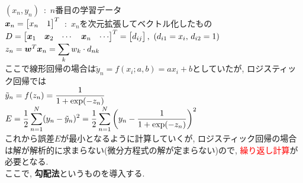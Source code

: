 \documentclass[dvipdfmx,a4j]{jsarticle}
\begin{document}
$(x_{n},y_{n})$\ :\ $n$番目の学習データ\\
$\mbox{\boldmath $x$}_{n}=\begin{bmatrix} x_{n}&1 \end{bmatrix}^{T}$\ :\ $x_{n}$を次元拡張してベクトル化したもの\\
$D=\begin{bmatrix}\mbox{\boldmath $x$}_{1}&\mbox{\boldmath $x$}_{2}&\cdots &\mbox{\boldmath $x$}_{n}&\cdots \end{bmatrix}^{T}=\begin{bmatrix}d_{ij}\end{bmatrix},\ (d_{i1}=x_{i},\,d_{i2}=1)$\\
$z_{n}=\mbox{\boldmath $w$}^{T}\mbox{\boldmath $x$}_{n}=\displaystyle \sum_{k}w_{k}\cdot d_{nk}$\\
ここで線形回帰の場合は$\tilde{y}_{n}=f(x_{i};a,b)=ax_{i}+b$としていたが, ロジスティック回帰では\\
$\tilde{y}_{n}=f(z_{n})=\displaystyle \frac{1}{1+{\rm exp}(-z_{n})}$\\[0.1cm]
$\displaystyle E=\frac{1}{2}\sum_{n=1}^{N}(y_{n}-\tilde{y}_{n})^{2}=\frac{1}{2}\sum_{n=1}^{N}\left(y_{n}-\frac{1}{1+{\rm exp}(-z_{n})}\right)^{2}$\\[1cm]
これから誤差$E$が最小となるように計算していくが, ロジスティック回帰の場合は解が解析的に求まらない(微分方程式の解が定まらない)ので, \textcolor{red}{繰り返し計算}が必要となる.\\
ここで, {\bf 勾配法}というものを導入する.
\end{document}
